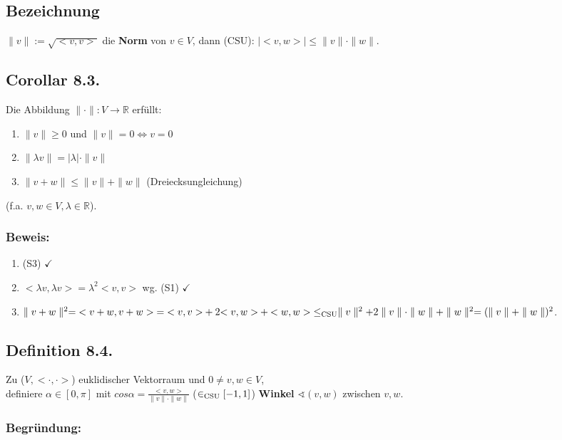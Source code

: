 \documentclass[a4paper, 12pt]{extarticle}
\newcommand{\norm}[1]{
	\parallel #1 \parallel
}
\newcommand{\tn}[1]{\textnormal {#1}}
\begin{document}
\subsection*{Bezeichnung}
$\parallel v \parallel := \sqrt{<v, v>}$ die \textbf{Norm} von $v \in V$, dann (CSU): $|<v, w>| \leq \parallel v\parallel \cdot \parallel w\parallel$.
\subsection*{Corollar 8.3.}
Die Abbildung $\parallel \cdot \parallel: V \longrightarrow \mathbb{R}$ erfüllt:
\begin{enumerate}[label=\alph*)]
	\item $\norm{v} \geq 0$ und $\norm{v} = 0 \Leftrightarrow v = 0$
	\item $\norm{\lambda v} = |\lambda|\cdot \norm{v}$
	\item $\norm{v+w} \leq \norm{v}+\norm{w}$ (Dreiecksungleichung)
\end{enumerate}
(f.a. $v, w \in V, \lambda \in \mathbb{R}$).
\subsubsection*{Beweis:}
\begin{enumerate}[label=\alph*)]
	\item (S3) $\checkmark$
	\item ${<\lambda v, \lambda v>} = \lambda^2{<v, v>}$ wg. (S1) $\checkmark$
	\item $\norm{v+w}^2 = {<v+w, v+w>} = {<v, v>}+2{<v, w>}+{<w, w>}\\ \leq_{\tn{CSU}} \norm{v}^2 + 2\norm{v}\cdot\norm{w}+\norm{w}^2 = (\norm{v}+\norm{w})^2$.
\end{enumerate}

\subsection*{Definition 8.4.}
Zu ($V, {<\cdot, \cdot>}$) euklidischer Vektorraum und $0 \neq v, w \in V$,\\ definiere $\alpha \in [0, \pi]$ mit $cos \alpha = \frac{<v, w>}{\norm{v}\cdot\norm{w}}$ ($\in_{\tn{CSU}} [-1, 1]$)
\textbf{Winkel} $\sphericalangle(v, w)$ zwischen $v, w$.
\newpage
\subsubsection*{Begründung:}
\begin{figure}[h]
\end{figure}
\end{document}
